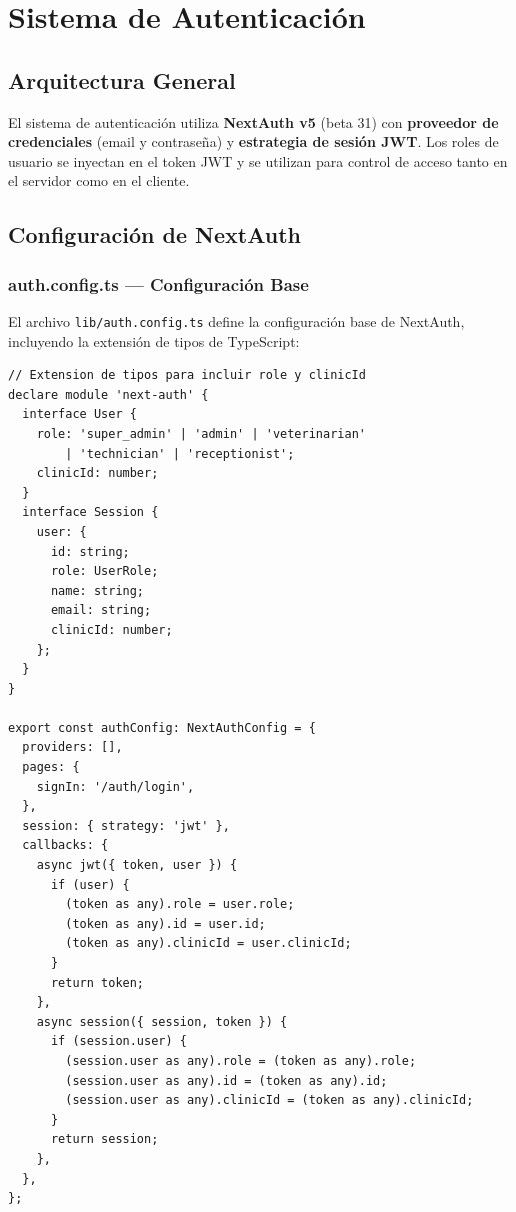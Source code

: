 \chapter{Sistema de Autenticaci\'on}

\section{Arquitectura General}

El sistema de autenticaci\'on utiliza \textbf{NextAuth v5} (beta 31) con
\textbf{proveedor de credenciales} (email y contrase\~na) y \textbf{estrategia
de sesi\'on JWT}. Los roles de usuario se inyectan en el token JWT y se
utilizan para control de acceso tanto en el servidor como en el cliente.

\section{Configuraci\'on de NextAuth}

\subsection{auth.config.ts --- Configuraci\'on Base}

El archivo \texttt{lib/auth.config.ts} define la configuraci\'on base de
NextAuth, incluyendo la extensi\'on de tipos de TypeScript:

\begin{lstlisting}[style=typescript, caption=auth.config.ts - Extension de tipos y configuracion base]
// Extension de tipos para incluir role y clinicId
declare module 'next-auth' {
  interface User {
    role: 'super_admin' | 'admin' | 'veterinarian'
        | 'technician' | 'receptionist';
    clinicId: number;
  }
  interface Session {
    user: {
      id: string;
      role: UserRole;
      name: string;
      email: string;
      clinicId: number;
    };
  }
}

export const authConfig: NextAuthConfig = {
  providers: [],
  pages: {
    signIn: '/auth/login',
  },
  session: { strategy: 'jwt' },
  callbacks: {
    async jwt({ token, user }) {
      if (user) {
        (token as any).role = user.role;
        (token as any).id = user.id;
        (token as any).clinicId = user.clinicId;
      }
      return token;
    },
    async session({ session, token }) {
      if (session.user) {
        (session.user as any).role = (token as any).role;
        (session.user as any).id = (token as any).id;
        (session.user as any).clinicId = (token as any).clinicId;
      }
      return session;
    },
  },
};
\end{lstlisting}


